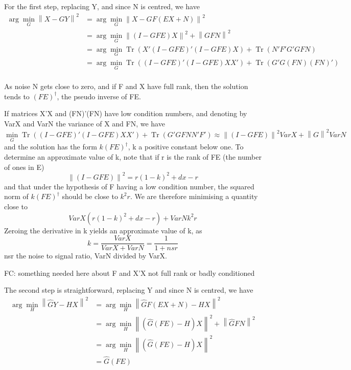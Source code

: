 \documentclass{article}
\DeclareMathOperator{\Tr}{Tr}
\begin{document}
For the first step, replacing Y, and since N is centred, we have
\begin{equation}
\begin{aligned}
\arg \min_G \left \| X-GY \right \|^2 &= \arg \min_G \left \| X - GF(EX+N)\right\|^2 \\
&{}= \arg \min_G \left \| (I-GFE)X\right\| ^2  + \left \| GFN\right \| ^2\\
&{}= \arg \min_G \Tr (X'(I-GFE)'(I-GFE)X) + \Tr (N'F'G'GFN)\\
&{}= \arg \min_G \Tr ((I-GFE)'(I-GFE)XX') + \Tr (G'G(FN)(FN)')\\
\end{aligned}
\end{equation}

As noise N gets close to zero, and if F and X have full rank, then the solution tends to $(FE)^\dagger$, the pseudo inverse of FE.

If matrices X'X and (FN)'(FN) have low condition numbers, and denoting by VarX and VarN the variance of X and FN, we have $$\min_G \Tr ((I-GFE)'(I-GFE)XX') + \Tr (G'GFNN'F') \approx \left \| (I-GFE)\right\| ^2 VarX  + \left \| G\right \| ^2 VarN$$and the solution has the form $k(FE)^\dagger$, k a positive constant below one. To determine an approximate value of k, note that if r is the rank of FE (the number of ones in E) $$\left \| (I-GFE)\right\| ^2 = r (1-k)^2 + dx - r$$ and that under the hypothesis of F having a low condition number, the squared norm of $k(FE)^\dagger$ should be close to $k^2r$. We are therefore minimising a quantity close to $$ VarX (r (1-k)^2 + dx - r) + VarN k^2 r$$ Zeroing the derivative in k yields an approximate value of k, as $$k= \frac {VarX}{VarX + VarN}=\frac{1}{1+nsr}$$ nsr the noise to signal ratio, VarN divided by VarX.

FC: something needed here about F and X'X not full rank or badly conditioned

The second step is straightforward, replacing Y and since N is centred, we have
\begin{equation}
\begin{aligned}
\arg \min_H \left \| \hat GY - HX \right \|^2 &=\arg  \min_H \left \| \hat GF(EX+N) - HX \right \|^2 \\
&=\arg \min_H \left \| (\hat G(FE)-H)X \right \| ^2 + \left \| \hat GFN \right \| ^2\\
&= \arg \min_H \left \| (\hat G(FE)-H)X \right \| ^2\\
&=\hat G (FE)
\end{aligned}
\end{equation}
\end{document}
